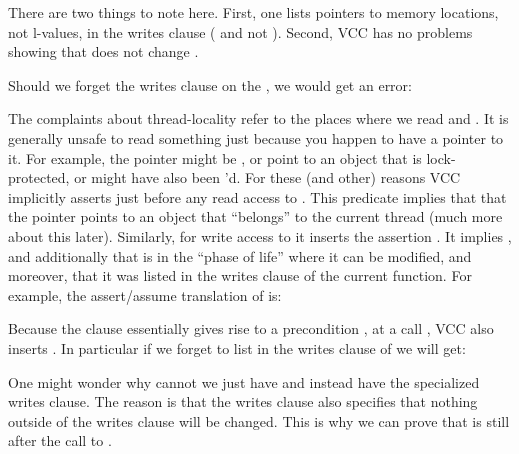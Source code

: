 There are two things to note here.
First, one lists pointers to memory locations, not l-values, in the writes
clause (\ie {} and not ).
Second, VCC has no problems showing that  does not change
.

Should we forget the writes clause on the , we would get an error:


\noindent
{}
The complaints about thread-locality refer to the places where we
read  and .
It is generally unsafe to read something just because you happen to have a pointer to it.
For example, the pointer might be , or point to an object
that is lock-protected, or might have also been 'd.
For these (and other) reasons VCC implicitly asserts
 just before any read access to .
This predicate implies that that the pointer points to an object that
``belongs'' to the current thread (much more about this later).
Similarly, for write access to  it inserts the assertion
.
It implies ,
and additionally that  is in the ``phase of life'' where
it can be modified, and moreover, that it was listed in the writes
clause of the current function.
For example, the assert/assume translation of  is:


\noindent
Because the clause  essentially gives rise to a precondition
, at a call  ,
VCC also inserts .
In particular if we forget to list  in the writes
clause of  we will get:


One might wonder why cannot we just have 
 and instead have the specialized writes clause.
The reason is that the writes clause also specifies that nothing
outside of the writes clause will be changed.
This is why we can prove that  is still  after the call
to . 




